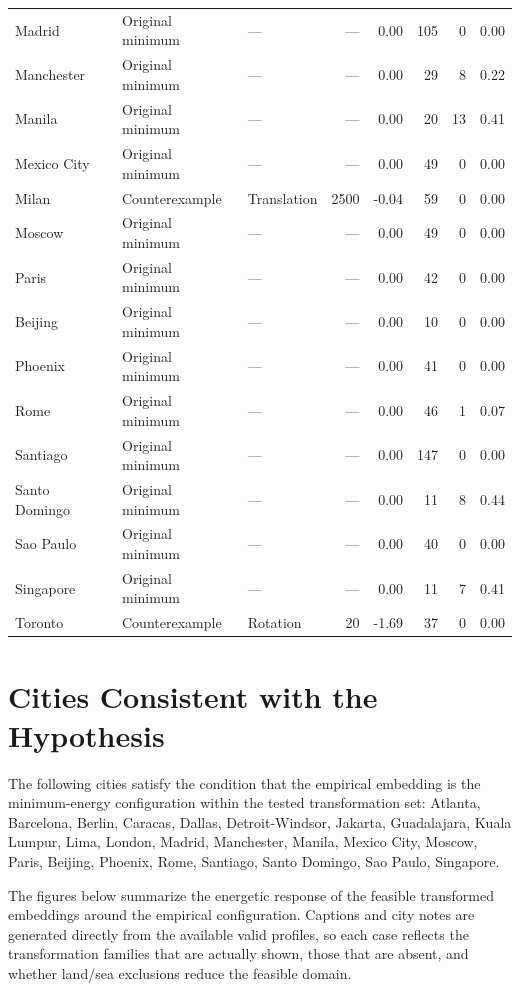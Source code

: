\documentclass{article}
\begin{document}
\begin{longtable}{lllrrrrr}
Madrid & Original minimum & --- & --- & 0.00 & 105 & 0 & 0.00 \\
Manchester & Original minimum & --- & --- & 0.00 & 29 & 8 & 0.22 \\
Manila & Original minimum & --- & --- & 0.00 & 20 & 13 & 0.41 \\
Mexico City & Original minimum & --- & --- & 0.00 & 49 & 0 & 0.00 \\
Milan & Counterexample & Translation & 2500 & -0.04 & 59 & 0 & 0.00 \\
Moscow & Original minimum & --- & --- & 0.00 & 49 & 0 & 0.00 \\
Paris & Original minimum & --- & --- & 0.00 & 42 & 0 & 0.00 \\
Beijing & Original minimum & --- & --- & 0.00 & 10 & 0 & 0.00 \\
Phoenix & Original minimum & --- & --- & 0.00 & 41 & 0 & 0.00 \\
Rome & Original minimum & --- & --- & 0.00 & 46 & 1 & 0.07 \\
Santiago & Original minimum & --- & --- & 0.00 & 147 & 0 & 0.00 \\
Santo Domingo & Original minimum & --- & --- & 0.00 & 11 & 8 & 0.44 \\
Sao Paulo & Original minimum & --- & --- & 0.00 & 40 & 0 & 0.00 \\
Singapore & Original minimum & --- & --- & 0.00 & 11 & 7 & 0.41 \\
Toronto & Counterexample & Rotation & 20 & -1.69 & 37 & 0 & 0.00 \\
\bottomrule
\end{longtable}


\section{Cities Consistent with the Hypothesis}

The following cities satisfy the condition that the empirical embedding is the minimum-energy configuration within the tested transformation set: Atlanta, Barcelona, Berlin, Caracas, Dallas, Detroit-Windsor, Jakarta, Guadalajara, Kuala Lumpur, Lima, London, Madrid, Manchester, Manila, Mexico City, Moscow, Paris, Beijing, Phoenix, Rome, Santiago, Santo Domingo, Sao Paulo, Singapore.

The figures below summarize the energetic response of the feasible transformed embeddings around the empirical configuration. Captions and city notes are generated directly from the available valid profiles, so each case reflects the transformation families that are actually shown, those that are absent, and whether land/sea exclusions reduce the feasible domain.
\end{document}
